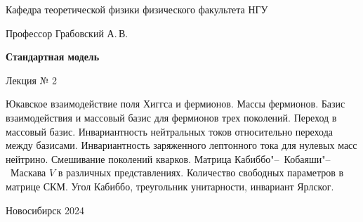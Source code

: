 \documentclass[12pt,pagesize,paper=192mm:108mm,landscape]{scrbook}
\begin{document}
\begin{titlepage}
\begin{center}
    Кафедра теоретической физики физического факультета НГУ
    \medskip

    \Large
    Профессор Грабовский А.\,В.
    \smallskip

    \huge
    \textbf{Стандартная модель}
    \smallskip

    \Large
    Лекция № 2
    \vfill

    \normalsize
    \begin{minipage}{0.85\linewidth}
      Юкавское взаимодействие поля Хиггса и фермионов. Массы
      фермионов. Базис взаимодействия и массовый базис для фермионов
      трех поколений. Переход в массовый базис. Инвариантность
      нейтральных токов относительно перехода между
      базисами. Инвариантность заряженного лептонного тока для нулевых
      масс нейтрино. Смешивание поколений кварков. Матрица
      Кабиббо"--~Кобаяши"--~Маскава $V$ в различных представлениях. Количество
      свободных параметров в матрице СКМ. Угол Кабиббо, треугольник
      унитарности, инвариант Ярлског.
    \end{minipage}
    \vfill

    \normalsize \ccbysa\hspace{0.5em}  Новосибирск 2024
  \end{center}
\end{titlepage}
\end{document}
